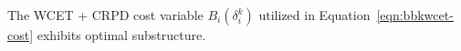 %
\begin{theorem}
\label{thm:optimal-substructure-cost}
The WCET + CRPD cost variable $B_{i}(\delta_{i}^{k})$ utilized in Equation~\ref{eqn:bbkwcet-cost} exhibits optimal substructure.
\end{theorem}
%
\noindent
